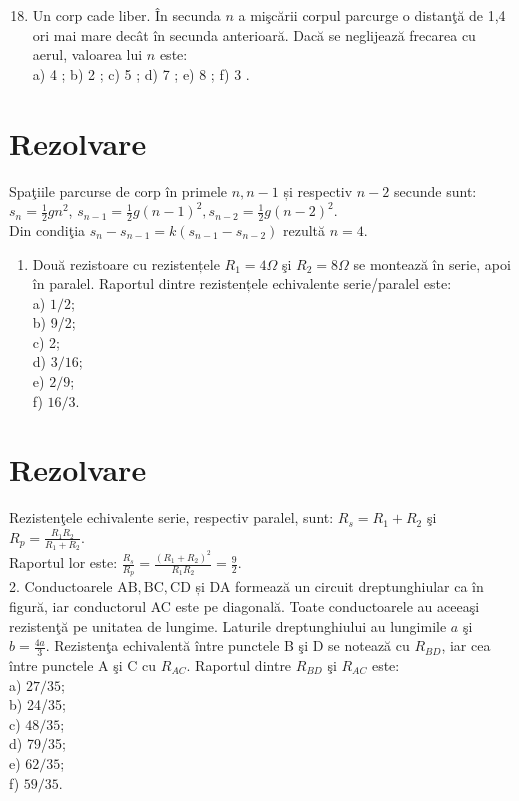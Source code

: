 \begin{enumerate}
  \setcounter{enumi}{17}
  \item Un corp cade liber. În secunda $n$ a mişcării corpul parcurge o distanţă de 1,4 ori mai mare decât în secunda anterioară. Dacă se neglijează frecarea cu aerul, valoarea lui $n$ este:\\
a) 4 ; b) 2 ; c) 5 ; d) 7 ; e) 8 ; f) 3 .
\end{enumerate}

\section*{Rezolvare}
Spaţiile parcurse de corp în primele $n, n-1$ și respectiv $n-2$ secunde sunt: $s_{n}=\frac{1}{2} g n^{2}$, $s_{n-1}=\frac{1}{2} g(n-1)^{2}, s_{n-2}=\frac{1}{2} g(n-2)^{2}$.\\
Din condiţia $s_{n}-s_{n-1}=k\left(s_{n-1}-s_{n-2}\right)$ rezultă $n=4$.


\begin{enumerate}
  \item Două rezistoare cu rezistențele $R_{1}=4 \Omega$ şi $R_{2}=8 \Omega$ se montează în serie, apoi în paralel. Raportul dintre rezistențele echivalente serie/paralel este:\\
a) $1 / 2$;\\
b) 9/2;\\
c) 2;\\
d) $3 / 16$;\\
e) $2 / 9$;\\
f) $16 / 3$.
\end{enumerate}

\section*{Rezolvare}
Rezistenţele echivalente serie, respectiv paralel, sunt: $R_{s}=R_{1}+R_{2}$ şi $R_{p}=\frac{R_{1} R_{2}}{R_{1}+R_{2}}$.\\
Raportul lor este: $\frac{R_{s}}{R_{p}}=\frac{\left(R_{1}+R_{2}\right)^{2}}{R_{1} R_{2}}=\frac{9}{2}$.\\
2. Conductoarele $\mathrm{AB}, \mathrm{BC}, \mathrm{CD}$ și DA formează un circuit dreptunghiular ca în figură, iar conductorul AC este pe diagonală. Toate conductoarele au aceeaşi rezistenţă pe unitatea de lungime. Laturile dreptunghiului au lungimile $a$ şi $b=\frac{4 a}{3}$. Rezistenţa echivalentă între punctele B şi D se notează cu $R_{B D}$, iar cea între punctele A şi C cu $R_{A C}$. Raportul dintre $R_{B D}$ şi $R_{A C}$ este:\\
a) $27 / 35$;\\
b) 24/35;\\
c) $48 / 35$;\\
d) 79/35;\\
e) $62 / 35$;\\
f) $59 / 35$.

